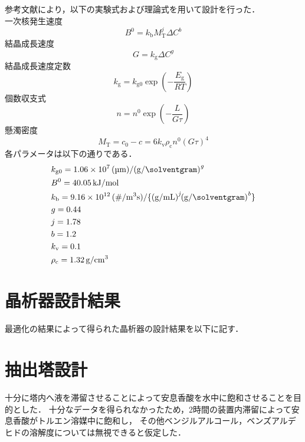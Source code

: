 \documentclass[a4j]{jsreport}
\begin{document}
参考文献\cite{晶析}により，以下の実験式および理論式を用いて設計を行った．\\
一次核発生速度
\begin{equation}
    B^0 = k_\mathrm{b} M_\mathrm{T}^j \Delta C^b
\end{equation}
結晶成長速度
\begin{equation}
    G = k_\mathrm{g}\Delta C^g
\end{equation}
結晶成長速度定数
\begin{equation}
    k_\mathrm{g} = k_\mathrm{g0} \exp \left( -\frac{E_\mathrm{g}}{RT} \right)
\end{equation}
個数収支式
\begin{equation}
    n=n^0 \exp \left( -\frac{L}{G\tau} \right)
\end{equation}
懸濁密度
\begin{equation}
    M_\mathrm{T} = c_0-c = 6k_\mathrm{v} \rho_\mathrm{c} n^0 (G\tau)^4
\end{equation}
各パラメータは以下の通りである．
\begin{align*}
    &k_\mathrm{g0} = 1.06\times10^7 \, \si{(\micro \meter)/(\gram / \solventgram)^{\textit{g}}} \\
    &B^{\mathrm{0}} = 40.05 \, \si{\kilo \joule / \mole} \\
    &k_\mathrm{b} = 9.16 \times 10^{12} \, \si{(\# / \cubic \meter \second) / \{ (\gram / \milli \liter)^{\textit{j}} (\gram / \solventgram)^{\textit{b}} \} } \\
    &g = 0.44 \\
    &j = 1.78 \\
    &b = 1.2 \\
    &k_\mathrm{v} = 0.1 \\
    &\rho_\mathrm{c} = 1.32 \, \si{\gram / \centi \metre \cubed}
\end{align*}

\section{晶析器設計結果}
最適化の結果によって得られた晶析器の設計結果を以下に記す．

\section{抽出塔設計}
十分に塔内へ液を滞留させることによって安息香酸を水中に飽和させることを目的とした．
十分なデータを得られなかったため，2時間の装置内滞留によって安息香酸がトルエン溶媒中に飽和し，
その他ベンジルアルコール，ベンズアルデヒドの溶解度については無視できると仮定した．
\end{document}
